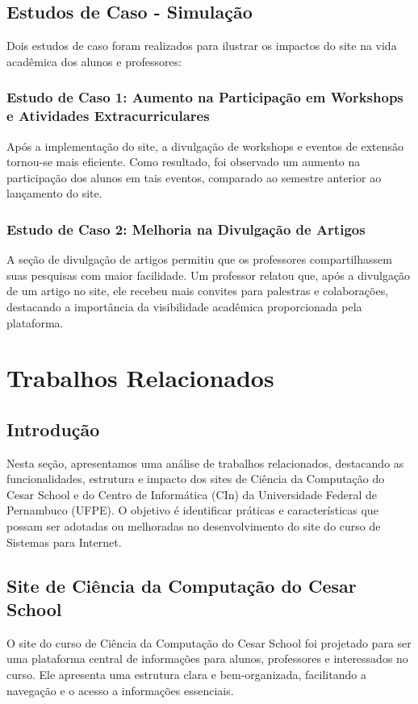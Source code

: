 \documentclass[a4paper,12pt]{report}
\begin{document}
\section{Estudos de Caso - Simulação}
Dois estudos de caso foram realizados para ilustrar os impactos do site na vida acadêmica dos alunos e professores:

\subsection{Estudo de Caso 1: Aumento na Participação em Workshops e Atividades Extracurriculares}
Após a implementação do site, a divulgação de workshops e eventos de extensão tornou-se mais eficiente. Como resultado, foi observado um aumento na participação dos alunos em tais eventos, comparado ao semestre anterior ao lançamento do site.

\subsection{Estudo de Caso 2: Melhoria na Divulgação de Artigos}
A seção de divulgação de artigos permitiu que os professores compartilhassem suas pesquisas com maior facilidade. Um professor relatou que, após a divulgação de um artigo no site, ele recebeu mais convites para palestras e colaborações, destacando a importância da visibilidade acadêmica proporcionada pela plataforma.

\chapter{Trabalhos Relacionados} 
\section{Introdução} 

Nesta seção, apresentamos uma análise de trabalhos relacionados, destacando as funcionalidades, estrutura e impacto dos sites de Ciência da Computação do Cesar School e do Centro de Informática (CIn) da Universidade Federal de Pernambuco (UFPE). O objetivo é identificar práticas e características que possam ser adotadas ou melhoradas no desenvolvimento do site do curso de Sistemas para Internet. 

\section{Site de Ciência da Computação do Cesar School} 
O site do curso de Ciência da Computação do Cesar School foi projetado para ser uma plataforma central de informações para alunos, professores e interessados no curso. Ele apresenta uma estrutura clara e bem-organizada, facilitando a navegação e o acesso a informações essenciais. 
\end{document}
